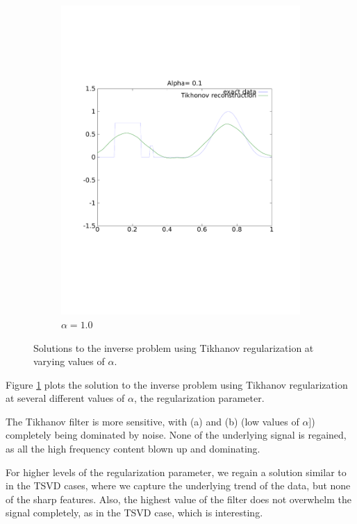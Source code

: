 \documentclass{article}
\begin{document}
\begin{figure}[!htb]
\begin{subfigure}[bh]{0.45\textwidth}
                \includegraphics[width=\textwidth]{plots/reconstruct1.pdf}
                \caption{$\alpha=1.0$}
        \end{subfigure}
        \caption{Solutions to the inverse problem using Tikhanov
 regularization at varying values of $\alpha$.} 
 \label{fig:tik}
\end{figure}

Figure \ref{fig:tik} plots the solution to the inverse problem using
Tikhanov regularization at several different values of $\alpha$, the
regularization parameter.  

The Tikhanov filter is more sensitive, with (a) and (b) (low values of
$\alpha]$) completely being dominated by noise. None of the underlying
signal is regained, as all the high frequency content blown up and
dominating. 

For higher levels of the regularization parameter, we regain a solution
similar to in the TSVD cases, where we capture the underlying trend of
the data, but none of the sharp features. Also, the highest value of the
filter does not overwhelm the signal completely, as in the TSVD case,
which is interesting. 
\end{document}
